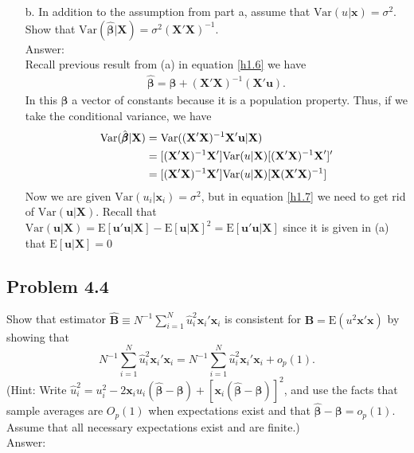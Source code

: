 \documentclass[10pt]{article}
\newcommand{\E}{\text{E}}
\newcommand{\V}{\text{Var}}
\begin{document}
\begin{enumerate}
\item[b.] In addition to the assumption from part a, assume that $\V(u|\mathbf{x})=\sigma^2.$ Show that $\V({\hat{\pmb{\beta}}}|\mathbf{X})=\sigma^2(\mathbf{X}'\mathbf{X})^{-1}.$
\\ Answer:\\
Recall previous result from (a) in equation \eqref{h1.6} we have
\begin{align*}
    \hat{\pmb{\beta}}=\pmb{\beta}+(\mathbf{X'X})^{-1}(\mathbf{X'u}).
\end{align*}
In this $\pmb{\beta}$ a vector of constants because it is a population property. Thus, if we take the conditional variance, we have
\begin{align}
    \V(\hat{\pmb{\beta}}|\textbf{X})&=\V((\mathbf{X'X})^{-1}\mathbf{X'u}|\textbf{X}) \notag \\
    &=[(\mathbf{X'X})^{-1}\mathbf{X'}]\V({u}|\textbf{X})[(\mathbf{X'X})^{-1}\textbf{X}']' \notag \\
    &=[(\mathbf{X'X})^{-1}\mathbf{X'}]\V({u}|\textbf{X})[\textbf{X}(\mathbf{X'X})^{-1}] \label{h1.7}
\end{align}
Now we are given $\V(u_i|\mathbf{x}_i)=\sigma^2$, but in equation \eqref{h1.7} we need to get rid of $\V({\textbf{u}}|\textbf{X})$. Recall that $\V({\textbf{u}}|\textbf{X})=\E[\mathbf{u'u}|\textbf{X}]-\E[\mathbf{u}|\textbf{X}]^2=\E[\mathbf{u'u}|\textbf{X}]$ since it is given in (a) that $\E[\mathbf{u}|\textbf{X}]=0$
\end{enumerate}

\subsection*{Problem 4.4}
Show that estimator $\hat{\mathbf{B}}\equiv N^{-1} \sum_{i=1}^{N}\hat{u}_i^2 \mathbf{x}_i'\mathbf{x}_i$ is consistent for $\mathbf{B}=\E(u^2\mathbf{x}'\mathbf{x})$ by showing that 
\[N^{-1} \sum_{i=1}^{N}\hat{u}_i^2 \mathbf{x}_i'\mathbf{x}_i=N^{-1} \sum_{i=1}^{N}\hat{u}_i^2 \mathbf{x}_i'\mathbf{x}_i+o_p(1).\]
(Hint: Write $\hat{u}_i^2=u_i^2-2\mathbf{x}_i u_i (\pmb{\hat{\beta}}-\pmb{\beta})+[\mathbf{x}_i (\pmb{\hat{\beta}}-\pmb{\beta})]^2$, and use the facts that sample averages are $O_p(1)$ when expectations exist and that $\pmb{\hat{\beta}}-\pmb{\beta}=o_p(1).$ Assume that all necessary expectations exist and are finite.)
\\ Answer:\\
\end{document}
